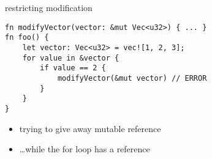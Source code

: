 
\begin{frame}[fragile,label=restrictMod]{restricting modification}
    \begin{verbatim}
fn modifyVector(vector: &mut Vec<u32>) { ... }
fn foo() {
    let vector: Vec<u32> = vec![1, 2, 3];
    for value in &vector {
        if value == 2 {
            modifyVector(&mut vector) // ERROR
        }
    }
}
    \end{verbatim}
\begin{itemize}
    \item trying to give away mutable reference
    \item \ldots while the for loop has a reference
\end{itemize}
\end{frame}


